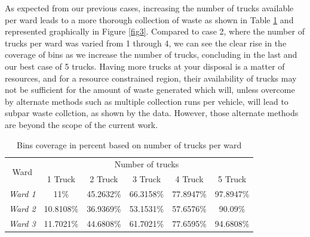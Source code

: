 \documentclass[12pt]{article}
\begin{document}
As expected from our previous cases, increasing the number of trucks available per ward leads to a more thorough collection of waste as shown in Table \ref{tab4} and represented graphically in Figure \ref{fig3}. Compared to case 2, where the number of trucks per ward was varied from 1 through 4, we can see the clear rise in the coverage of bins as we increase the number of trucks, concluding in the last and our best case of 5 trucks. Having more trucks at your disposal is a matter of resources, and for a resource constrained region, their availability of trucks may not be sufficient for the amount of waste generated which will, unless overcome by alternate methods such as multiple collection runs per vehicle, will lead to subpar waste collction, as shown by the data. However, those alternate methods are beyond the scope of the current work.
\begin{table}[H]
    \centering
    \caption{ Bins coverage in percent based on number of trucks per ward} \label{tab4}
    \vspace*{0.3cm}
    \begin{tabular}{|c|c|c|c|c|c|}
        \hline \multirow{2}{*}{Ward} & \multicolumn{5}{c|}{Number of trucks}\\
        \cline{2-6}& 1 Truck& 2 Truck& 3 Truck& 4 Truck& 5 Truck\\
        \hline \textit{Ward 1} & 11\%& 45.2632\%& 66.3158\%& 77.8947\%& 97.8947\%\\
        \hline \textit{Ward 2} &10.8108\%&36.9369\%&53.1531\%&57.6576\%&90.09\%\\
        \hline \textit{Ward 3} &11.7021\%&44.6808\%&61.7021\%&77.6595\%&94.6808\%\\
        \hline
    \end{tabular}
\end{table}
\end{document}
